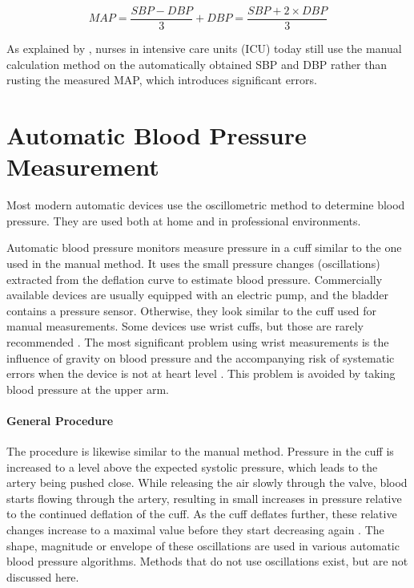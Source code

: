 \begin{equation}
\label{eq:MAP}
MAP = \frac{SBP-DBP}{3}+DBP = \frac{SBP+2\times DBP}{3}
\end{equation}

As explained by \cite{Joe2019}, nurses in intensive care units (ICU) today still use the manual calculation method on the automatically obtained SBP and DBP rather than rusting the measured MAP, which introduces significant errors.

\section{Automatic Blood Pressure Measurement}
Most modern automatic devices use the oscillometric method to determine blood pressure. They are used both at home and in professional environments.

Automatic blood pressure monitors measure pressure in a cuff similar to the one used in the manual method. It uses the small pressure changes (oscillations) extracted from the deflation curve to estimate blood pressure. Commercially available devices are usually equipped with an electric pump, and the bladder contains a pressure sensor. Otherwise, they look similar to the cuff used for manual measurements. Some devices use wrist cuffs, but those are rarely recommended \citep{BIHS2020}. The most significant problem using wrist measurements is the influence of gravity on blood pressure and the accompanying risk of systematic errors when the device is not at heart level \citep{Boron2012}. This problem is avoided by taking blood pressure at the upper arm.

\paragraph{General Procedure} The procedure is likewise similar to the manual method. Pressure in the cuff is increased to a level above the expected systolic pressure, which leads to the artery being pushed close. While releasing the air slowly through the valve, blood starts flowing through the artery, resulting in small increases in pressure relative to the continued deflation of the cuff. As the cuff deflates further, these relative changes increase to a maximal value before they start decreasing again \citep{Forouzanfar2015, Drzewiecki1994, Ursino1996}. The shape, magnitude or envelope of these oscillations are used in various automatic blood pressure algorithms. Methods that do not use oscillations exist, but are not discussed here. 


